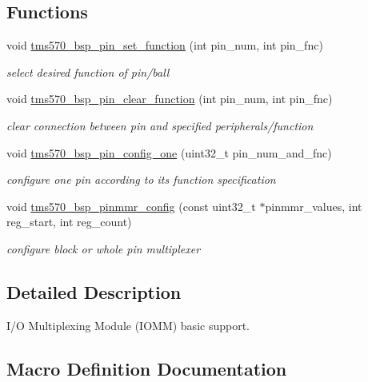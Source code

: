 \subsection*{Functions}
\begin{DoxyCompactItemize}
\item 
void \mbox{\hyperlink{tms570-pinmux_8h_a096924e434015941cae44dce897ea5ef}{tms570\+\_\+bsp\+\_\+pin\+\_\+set\+\_\+function}} (int pin\+\_\+num, int pin\+\_\+fnc)
\begin{DoxyCompactList}\small\item\em select desired function of pin/ball \end{DoxyCompactList}\item 
void \mbox{\hyperlink{tms570-pinmux_8h_ac225c1f6113c3a39dfe69324b07fa625}{tms570\+\_\+bsp\+\_\+pin\+\_\+clear\+\_\+function}} (int pin\+\_\+num, int pin\+\_\+fnc)
\begin{DoxyCompactList}\small\item\em clear connection between pin and specified peripherals/function \end{DoxyCompactList}\item 
void \mbox{\hyperlink{tms570-pinmux_8h_a3f1fcae6177e90127dd1af7e9c93efe4}{tms570\+\_\+bsp\+\_\+pin\+\_\+config\+\_\+one}} (uint32\+\_\+t pin\+\_\+num\+\_\+and\+\_\+fnc)
\begin{DoxyCompactList}\small\item\em configure one pin according to its function specification \end{DoxyCompactList}\item 
void \mbox{\hyperlink{tms570-pinmux_8h_a061d7b53280d6fc349a4157613712aef}{tms570\+\_\+bsp\+\_\+pinmmr\+\_\+config}} (const uint32\+\_\+t $\ast$pinmmr\+\_\+values, int reg\+\_\+start, int reg\+\_\+count)
\begin{DoxyCompactList}\small\item\em configure block or whole pin multiplexer \end{DoxyCompactList}\end{DoxyCompactItemize}


\subsection{Detailed Description}
I/O Multiplexing Module (I\+O\+MM) basic support. 



\subsection{Macro Definition Documentation}
\mbox{\label{tms570-pinmux_8h_ae8298307eab7ef81053dd6307c3eb00e}} 
